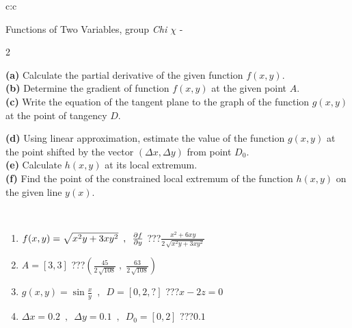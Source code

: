\documentclass[10pt]{report}
\begin{document}
\begin{tabular}{c:c}
\begin{minipage}[c][104.5mm][t]{0.5\linewidth}
\begin{center}
\vspace{7mm}
{\huge \LARGE Functions of Two Variables, group \textit{Chi $\chi$} -}\\[5mm]
\begin{minipage}{0.95\linewidth}
\begin{center}
{\small \begin{multicols}{2} \raggedright
\textbf{(a)} Calculate the partial derivative of the given function \(f(x,y)\). \\[1mm]
\textbf{(b)} Determine the gradient of function \(f(x,y)\) at the given point \(A\). \\[1mm]
\textbf{(c)} Write the equation of the tangent plane to the graph of the function \(g(x,y)\) at the point of tangency \(D\). \par \columnbreak
\textbf{(d)} Using linear approximation, estimate the value of the function \(g(x,y)\) at the point shifted by the vector \((\Delta x, \Delta y)\) from point \(D_0\). \\[1mm]
\textbf{(e)} Calculate \(h(x,y)\) at its local extremum. \\[1mm]
\textbf{(f)} Find the point of the constrained local extremum of the function \(h(x,y)\) on the given line \(y(x)\). \\[1mm]
\end{multicols}
}
\end{center}
\end{minipage}
\\[4mm]
\begin{minipage}{0.79\linewidth}
\begin{center}
\begin{varwidth}{\linewidth}
\begin{enumerate}
\normalsizerr
\item $f(x,y) = \sqrt{x^2y + 3xy^2}\enspace , \enspace \pdv{f}{y}$\quad \dotfill\; ???\;\dotfill \quad $\frac{x^2+6xy}{2\,\sqrt{x^2y+3xy^2}}$
\item $A = [3, 3]$\quad \dotfill\; ???\;\dotfill \quad $\left( \frac{45}{2\,\sqrt{108}} \;,\; \frac{63}{2\,\sqrt{108}} \right)$
\item $g(x,y) = \sin\frac{x}{y} \enspace , \enspace D = [0, 2, ?]$\quad \dotfill\; ???\;\dotfill \quad $x-2z=0$
\item $\Delta x = {0.2} \enspace,\enspace \Delta y = {0.1} \enspace,\enspace D_0 = [0,2]$\quad \dotfill\; ???\;\dotfill \quad $0.1$

\end{enumerate}
\end{varwidth}
\end{center}
\end{minipage}
\end{center}
\end{minipage}
\end{tabular}
\end{document}
